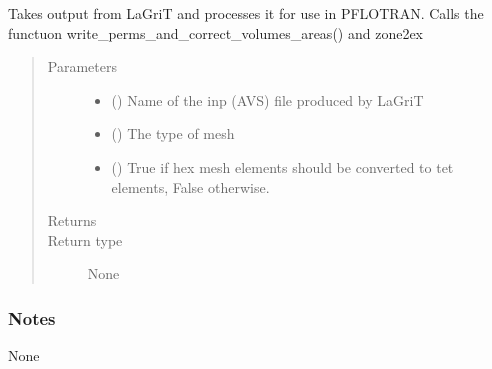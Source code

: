 \documentclass[letterpaper,10pt,english]{sphinxmanual}
\begin{document}

\begin{fulllineitems}
\label{\detokenize{pydfnworks:pydfnworks.dfnFlow.pflotran.lagrit2pflotran}}
Takes output from LaGriT and processes it for use in PFLOTRAN.
Calls the functuon write\_perms\_and\_correct\_volumes\_areas() and zone2ex
\begin{quote}\begin{description}
\item[{Parameters}] \leavevmode\begin{itemize}
\item {} 
 () \textendash{} Name of the inp (AVS) file produced by LaGriT

\item {} 
 () \textendash{} The type of mesh

\item {} 
 () \textendash{} True if hex mesh elements should be converted to tet elements, False otherwise.

\end{itemize}

\item[{Returns}] \leavevmode


\item[{Return type}] \leavevmode
None

\end{description}\end{quote}
\subsubsection*{Notes}

None

\end{fulllineitems}

\end{document}
